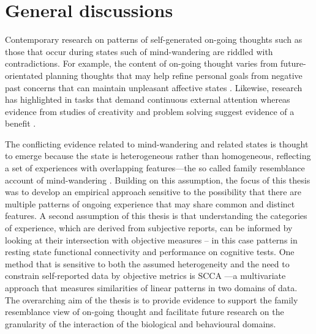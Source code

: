 \chapter{General discussions}
\label{ch:discussion}
Contemporary research on patterns of self-generated on-going thoughts such as those that occur during states such of mind-wandering are riddled with contradictions. For example, the content of on-going thought varies from future-orientated planning thoughts that may help refine personal goals \cite{Medea2016} from negative past concerns that can maintain unpleasant affective states \cite{Killingsworth2010}. Likewise, research has highlighted in tasks that demand continuous external attention \cite{McVayJOEP2009,McVay2012} whereas evidence from studies of creativity and problem solving suggest evidence of a benefit \cite{Smeekens2016,Baird2012}. 

The conflicting evidence related to mind-wandering and related states is thought to emerge because the state is heterogeneous rather than homogeneous, reflecting a set of experiences with overlapping features---the so called family resemblance account of mind-wandering \cite{Smallwood2013, Seli2018}. Building on this assumption, the focus of this thesis was to develop an empirical approach sensitive to the possibility that there are multiple patterns of ongoing experience that may share common and distinct features. A second assumption of this thesis is that understanding the categories of experience, which are derived from subjective reports, can be informed by looking at their intersection with objective measures – in this case patterns in resting state functional connectivity and performance on cognitive tests. One method that is sensitive to both the assumed heterogeneity and the need to constrain self-reported data by objective metrics is SCCA \cite{WittenSCCA2009}---a multivariate approach that measures similarities of linear patterns in two domains of data. The overarching aim of the thesis is to provide evidence to support the family resemblance view of on-going thought and facilitate future research on the granularity of the interaction of the biological and behavioural domains.

